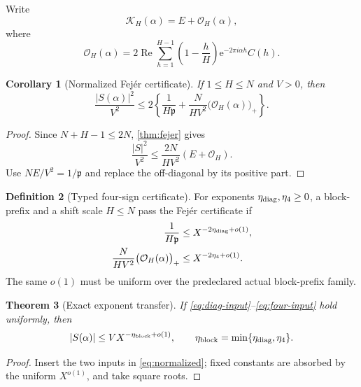 \documentclass[11pt]{article}
\newtheorem{theorem}{Theorem}[section]
\newtheorem{corollary}[theorem]{Corollary}
\theoremstyle{definition}
\newtheorem{definition}[theorem]{Definition}
\theoremstyle{remark}
\newcommand{\e}{\mathrm e}
\begin{document}
Write
\begin{equation}
 \mathcal K_H(\alpha)=E+\mathcal O_H(\alpha),
\label{eq:offdiag-split}
\end{equation}
where
\begin{equation}
 \mathcal O_H(\alpha)
 =
 2\operatorname{Re}
 \sum_{h=1}^{H-1}
 \left(1-\frac hH\right)
 \e^{-2\pi i\alpha h}C(h).
\label{eq:OH}
\end{equation}

\begin{corollary}[Normalized Fej\'er certificate]
\label{cor:normalized}
If \(1\le H\le N\) and \(V>0\), then
\begin{equation}
\boxed{
 \frac{|S(\alpha)|^2}{V^2}
 \le
 2\left\{
 \frac1{H\mathfrak p}
 +
 \frac{N}{HV^2}
 \bigl(\mathcal O_H(\alpha)\bigr)_+
 \right\}.}
\label{eq:normalized}
\end{equation}
\end{corollary}

\begin{proof}
Since \(N+H-1\le2N\), \cref{thm:fejer} gives
\[
 \frac{|S|^2}{V^2}
 \le\frac{2N}{HV^2}(E+\mathcal O_H).
\]
Use \(NE/V^2=1/\mathfrak p\) and replace the off-diagonal by its
positive part.
\end{proof}

\begin{definition}[Typed four-sign certificate]
\label{def:typed}
For exponents \(\eta_{\rm diag},\eta_4\ge0\), a block-prefix and a
shift scale \(H\le N\) pass the Fej\'er certificate if
\begin{align}
 \frac1{H\mathfrak p}
 &\le X^{-2\eta_{\rm diag}+o(1)},
\label{eq:diag-input}\\
 \frac{N}{HV^2}
 \bigl(\mathcal O_H(\alpha)\bigr)_+
 &\le X^{-2\eta_4+o(1)}.
\label{eq:four-input}
\end{align}
The same \(o(1)\) must be uniform over the predeclared actual
block-prefix family.
\end{definition}

\begin{theorem}[Exact exponent transfer]
\label{thm:transfer}
If \eqref{eq:diag-input}--\eqref{eq:four-input} hold uniformly, then
\begin{equation}
 |S(\alpha)|
 \le
 V X^{-\eta_{\rm block}+o(1)},
\qquad
 \eta_{\rm block}
 =
 \min\{\eta_{\rm diag},\eta_4\}.
\label{eq:block-saving}
\end{equation}
\end{theorem}

\begin{proof}
Insert the two inputs in \eqref{eq:normalized}; fixed constants are
absorbed by the uniform \(X^{o(1)}\), and take square roots.
\end{proof}
\end{document}
